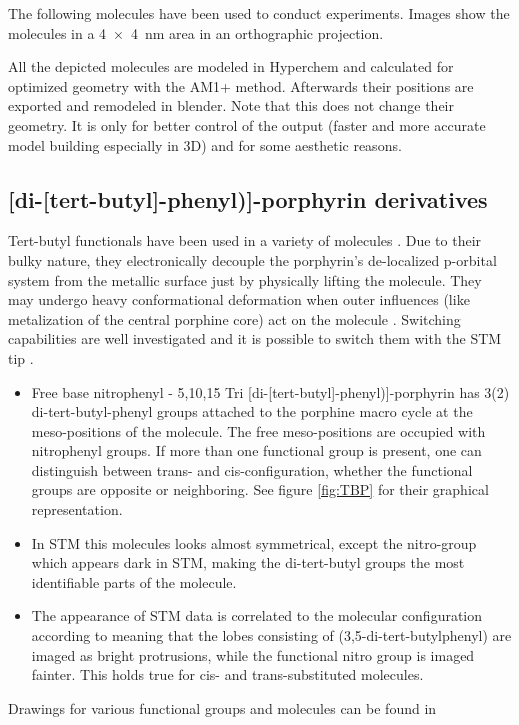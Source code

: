 
\label{chapter:used-molecules}
The following molecules have been used to conduct experiments. Images show the molecules in a \SI{4x4}{\nano \meter} area in an orthographic projection. 

All the depicted molecules are modeled in Hyperchem\cite{_hyperchemtm_1111} and calculated for optimized geometry with the AM1+ method. Afterwards their positions are exported and remodeled in blender. Note that this does not change their geometry. It is only for better control of the output (faster and more accurate model building especially in 3D) and for some aesthetic reasons.

\subsection{[di-[tert-butyl]-phenyl)]-porphyrin derivatives}
Tert-butyl functionals have been used in a variety of molecules \cite{moresco_conformational_2001}. Due to their bulky nature, they electronically decouple the porphyrin’s de-localized p-orbital system from the metallic surface just by physically lifting the molecule. They may undergo heavy conformational deformation when outer influences (like metalization of the central porphine core) act on the molecule \cite{stark_massive_2014}. Switching capabilities are well investigated \cite{loppacher_direct_2003} and it is possible to switch them with the STM tip \cite{ditze_energetics_2014}.

\begin{itemize}
	\item Free base nitrophenyl - 5,10,15 Tri [di-[tert-butyl]-phenyl)]-porphyrin  has 3(2) di-tert-butyl-phenyl groups attached to the porphine macro cycle at the meso-positions of the molecule. The free meso-positions are occupied with nitrophenyl groups. If more than one functional group is present, one can distinguish between trans- and cis-configuration, whether the functional groups are opposite or neighboring. See figure \ref{fig:TBP} for their graphical representation.
	\item In STM this molecules looks almost symmetrical, except the nitro-group which appears dark in STM, making the di-tert-butyl groups the most identifiable parts of the molecule.
	\item The appearance of STM data is correlated to the molecular configuration according to \cite{mishra_current-driven_2015} meaning that the lobes consisting of (3,5-di-tert-butylphenyl) are imaged as bright protrusions, while the functional nitro group is imaged fainter. This holds true for cis- and trans-substituted molecules.
\end{itemize}
Drawings for various functional groups and molecules can be found in \cite{jorgensen_salem_1973}

